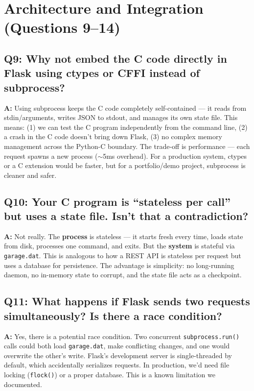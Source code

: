\documentclass[12pt, a4paper]{article}
\begin{document}
\section{Architecture and Integration (Questions 9--14)}

\subsection{Q9: Why not embed the C code directly in Flask using ctypes or CFFI instead of subprocess?}

\textbf{A:} Using subprocess keeps the C code completely self-contained --- it reads from stdin/arguments, writes JSON to stdout, and manages its own state file. This means: (1) we can test the C program independently from the command line, (2) a crash in the C code doesn't bring down Flask, (3) no complex memory management across the Python-C boundary. The trade-off is performance --- each request spawns a new process ($\sim$5ms overhead). For a production system, ctypes or a C extension would be faster, but for a portfolio/demo project, subprocess is cleaner and safer.

\subsection{Q10: Your C program is ``stateless per call'' but uses a state file. Isn't that a contradiction?}

\textbf{A:} Not really. The \textbf{process} is stateless --- it starts fresh every time, loads state from disk, processes one command, and exits. But the \textbf{system} is stateful via \texttt{garage.dat}. This is analogous to how a REST API is stateless per request but uses a database for persistence. The advantage is simplicity: no long-running daemon, no in-memory state to corrupt, and the state file acts as a checkpoint.

\subsection{Q11: What happens if Flask sends two requests simultaneously? Is there a race condition?}

\textbf{A:} Yes, there is a potential race condition. Two concurrent \texttt{subprocess.run()} calls could both load \texttt{garage.dat}, make conflicting changes, and one would overwrite the other's write. Flask's development server is single-threaded by default, which accidentally serializes requests. In production, we'd need file locking (\texttt{flock()}) or a proper database. This is a known limitation we documented.
\end{document}
